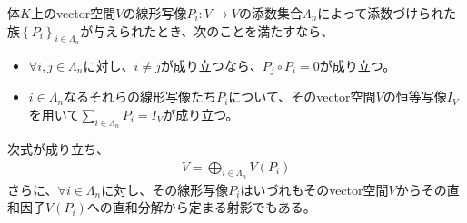 \documentclass[dvipdfmx]{jsarticle}
\begin{document}
\begin{thm}\label{2.2.1.10}
体$K$上のvector空間$V$の線形写像$P_{i}:V \rightarrow V$の添数集合$\varLambda_{n}$によって添数づけられた族$\left\{ P_{i} \right\}_{i \in \varLambda_{n}}$が与えられたとき、次のことを満たすなら、
\begin{itemize}
\item
  $\forall i,j \in \varLambda_{n}$に対し、$i \neq j$が成り立つなら、$P_{j} \circ P_{i} = 0$が成り立つ。
\item
  $i \in \varLambda_{n}$なるそれらの線形写像たち$P_{i}$について、そのvector空間$V$の恒等写像$I_{V}$を用いて$\sum_{i \in \varLambda_{n}} P_{i} = I_{V}$が成り立つ。
\end{itemize}
次式が成り立ち、
\begin{align*}
V = \bigoplus_{i \in \varLambda_{n}} {V\left( P_{i} \right)}
\end{align*}
さらに、$\forall i \in \varLambda_{n}$に対し、その線形写像$P_{i}$はいづれもそのvector空間$V$からその直和因子$V\left( P_{i} \right)$への直和分解から定まる射影でもある。
\end{thm}
\end{document}
